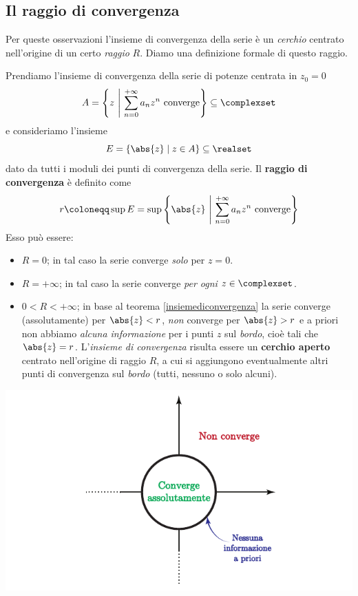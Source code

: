 \subsection{Il raggio di convergenza}
Per queste osservazioni l'insieme di convergenza della serie è un \textit{cerchio} centrato nell'origine di un certo \textit{raggio} $R$. Diamo una definizione formale di questo raggio.
\begin{define}
	Prendiamo l'insieme di convergenza della serie di potenze centrata in $z_0=0$
	\begin{equation*}
		A=\left\{z \ \middle\vert \ \sum_{n=0}^{+\infty} a_n z^n \ \mbox{converge} \right\}\subseteq \complexset
	\end{equation*}
	 e consideriamo l'insieme
	 \begin{equation*}
	 	E=\left\{\abs{z}\mid z\in A\right\}\subseteq\realset
	 \end{equation*}
 	dato da tutti i moduli dei punti di convergenza della serie. Il \textbf{raggio di convergenza} è definito come
	\begin{equation*}
		r\coloneqq\sup E=\sup\left\{\abs{z}\ \middle| \ \sum_{n=0}^{+\infty} a_n z^n \ \mbox{converge} \right\}
	\end{equation*}
	Esso può essere:
	\begin{itemize}
		\item $R=0$; in tal caso la serie converge \textit{solo} per $z=0$.
		\item $R=+\infty$; in tal caso la serie converge \textit{per ogni} $z\in\complexset$.
		\item $0<R<+\infty$; in base al teorema \ref{insiemediconvergenza} la serie converge (assolutamente) per $\abs{z}<r$, \textit{non} converge per $\abs{z}>r$ e a priori non abbiamo \textit{alcuna informazione} per i punti $z$ sul \textit{bordo}, cioè tali che $\abs{z}=r$. L'\textit{insieme di convergenza} risulta essere un \textbf{cerchio aperto} centrato nell'origine di raggio $R$, a cui si aggiungono eventualmente altri punti di convergenza sul \textit{bordo} (tutti, nessuno o solo alcuni).
	\end{itemize}
	\begin{center}
		\includegraphics[trim=2.5cm 0.5cm 2.5cm 0cm, clip, scale=1]{images/discoconvergenza.pdf}
	\end{center}
\end{define}
